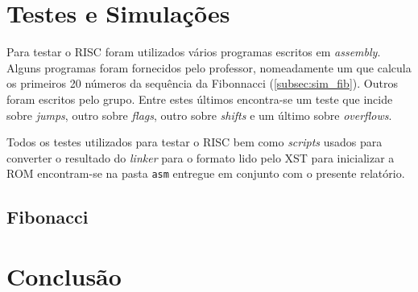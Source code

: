 \documentclass[a4paper]{article}
\begin{document}
	\section{Testes e Simulações}
	
		Para testar o \textmu RISC foram utilizados vários programas escritos em \textit{assembly}. Alguns programas foram fornecidos pelo professor, nomeadamente um que calcula os primeiros 20 números da sequência da Fibonnacci (\autoref{subsec:sim_fib}). Outros foram escritos pelo grupo. Entre estes últimos encontra-se um teste que incide sobre \textit{jumps}, outro sobre \textit{flags}, outro sobre \textit{shifts} e um último sobre \textit{overflows}.
		
		Todos os testes utilizados para testar o \textmu RISC bem como \textit{scripts} usados para converter o resultado do \textit{linker} para o formato lido pelo XST para inicializar a ROM encontram-se na pasta \texttt{asm} entregue em conjunto com o presente relatório.
	
		\subsection{Fibonacci}
		\label{subsec:sim_fib}
		
	\section{Conclusão}
	
\end{document}
